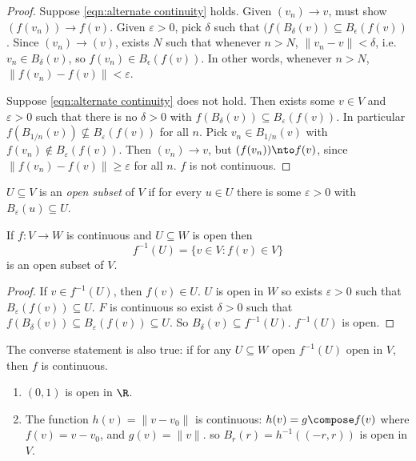 \documentclass[a4paper]{article}
\theoremstyle{definition}
\begin{document}
\begin{proof}
  Suppose \eqref{eqn:alternate continuity} holds. Given $(v_n)\to v$, must show $(f(v_n))\to f(v)$. Given $\varepsilon>0$, pick $\delta$ such that $(f(B_\delta(v))\subseteq B_\epsilon(f(v))$. Since $(v_n)\to (v)$, exists $N$ such that whenever $n>N$, $\|v_n - v\| < \delta$, i.e.\ $v_n \in B_\delta(v)$, so $f(v_n) \in B_\epsilon(f(v))$. In other words, whenever $n>N$, $\|f(v_n)-f(v)\| <\varepsilon$.

  Suppose \eqref{eqn:alternate continuity} does not hold. Then exists some $v \in V$ and $\varepsilon>0$ such that there is no $\delta>0$ with $f(B_\delta(v)) \subseteq B_\varepsilon(f(v))$. In particular $f(B_{1/n}(v)) \nsubseteq B_\varepsilon(f(v))$ for all $n$. Pick $v_n \in B_{1/n}(v)$ with $f(v_n) \notin B_\varepsilon(f(v))$. Then $(v_n)\to v$, but $(f(v_n)) \nto f(v)$, since $\|f(v_n) - f(v) \| \geq \varepsilon$ for all $n$. $f$ is not continuous.
\end{proof}

\begin{definition}
  $U \subseteq V$ is an \emph{open subset} of $V$ if for every $u \in U$ there is some $\varepsilon>0$ with $B_\varepsilon(u) \subseteq U$.
\end{definition}

\begin{proposition}
  If $f:V\to W$ is continuous and $U\subseteq W$ is open then
  \[
    f^{-1}(U) = \{v \in V: f(v) \in V\}
  \]
  is an open subset of $V$.
\end{proposition}

\begin{proof}
  If $v\in f^{-1}(U)$, then $f(v) \in U$. $U$ is open in $W$ so exists $\varepsilon>0$ such that $B_\varepsilon(f(v)) \subseteq U$. $F$ is continuous so exist $\delta>0$ such that $f(B_\delta(v)) \subseteq B_\varepsilon(f(v)) \subseteq U$. So $B_\delta(v) \subseteq f^{-1}(U)$. $f^{-1}(U)$ is open.
\end{proof}

\begin{remark}
  The converse statement is also true: if for any $U \subseteq W$ open $f^{-1}(U)$ open in $V$, then $f$ is continuous.
\end{remark}

\begin{eg}\leavevmode
  \begin{enumerate}
  \item $(0,1)$ is open in $\R$.
    \item The function $h(v) = \|v-v_0\|$ is continuous: $h(v) = g \compose f(v)$ where $f(v) = v-v_0$, and $g(v)=\|v\|$. so $B_r(r) = h^{-1}((-r,r))$ is open in $V$.
  \end{enumerate}
\end{eg}
\end{document}
